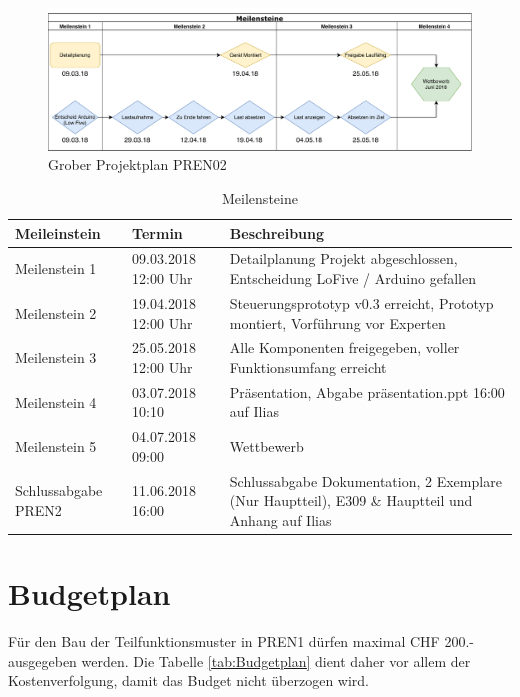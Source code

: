 \documentclass[a4paper]{report}
\begin{document}
\begin{figure}[h!]
	\includegraphics[width=\linewidth,keepaspectratio]{Rahmenplan}
	\caption{Grober Projektplan PREN02}
	\label{fig:GrobProjekt}
\end{figure}

\begin{table}[h!]
	\vspace{1em}
	\noindent
	\begin{tabular}{|p{}|p{}|p{}|}
		\hline
		\textbf{Meileinstein} & \textbf{Termin} & \textbf{Beschreibung} \\
		\hline
		Meilenstein 1 & 09.03.2018 12:00 Uhr & Detailplanung Projekt abgeschlossen, Entscheidung LoFive / Arduino gefallen\\
		\hline
		Meilenstein 2 & 19.04.2018 12:00 Uhr & Steuerungsprototyp v0.3 erreicht, Prototyp  montiert, Vorführung vor Experten\\
		\hline
		Meilenstein 3 & 25.05.2018 12:00 Uhr & Alle Komponenten freigegeben, voller Funktionsumfang erreicht\\
		\hline
		Meilenstein 4 & 03.07.2018 10:10 & Präsentation, Abgabe präsentation.ppt 16:00 auf Ilias\\
		\hline
		Meilenstein 5 & 04.07.2018 09:00 & Wettbewerb\\
		\hline
		Schlussabgabe PREN2 & 11.06.2018 16:00 & Schlussabgabe Dokumentation, 2 Exemplare (Nur Hauptteil), E309 \& Hauptteil und Anhang auf Ilias \\
		\hline
	\end{tabular}
	\caption{Meilensteine}
	\label{tab:Meilensteine}
\end{table}

\newpage

\section{Budgetplan}
\label{sec:Budgetplan}
Für den Bau der Teilfunktionsmuster in PREN1 dürfen maximal CHF 200.- ausgegeben werden. Die Tabelle \ref{tab:Budgetplan} dient daher vor allem der Kostenverfolgung, damit das Budget nicht überzogen wird.
\end{document}
